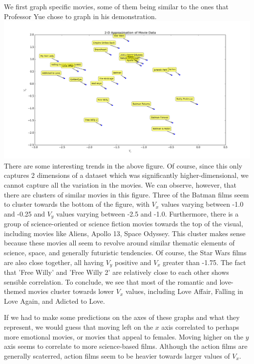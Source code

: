 \documentclass{article}
\begin{document}
We first graph specific movies, some of them being similar to the ones
that Professor Yue chose to graph in his demonstration.\\
\includegraphics[width=1\textwidth]{final_graph_1}
There are some interesting trends in the above figure. Of course, since
this only captures 2 dimensions of a dataset which was significantly
higher-dimensional, we cannot capture all the variation in the movies.
We can observe, however, that there are clusters of similar movies
in this figure. Three of the Batman films seem to cluster towards the bottom
of the figure, with $V_{x}$ values varying between -1.0 and -0.25 and
$V_y$ values varying between -2.5 and -1.0. Furthermore, there is a group
of science-oriented or science fiction movies towards the top of the visual,
including movies like Aliens, Apollo 13, Space Odyssey. This cluster makes
sense because these movies all seem to revolve around similar thematic elements
of science, space, and generally futuristic tendencies. Of course, the Star Wars
films are also close together, all having $V_{y}$ positive and $V_x$ greater than
-1.75. The fact that 'Free Willy' and 'Free Willy 2' are relatively close
to each other shows sensible correlation. To conclude, we see that most of
the romantic and love-themed movies cluster towards lower $V_x$ values,
including Love Affair, Falling in Love Again, and Adicted to Love.

If we had to make some predictions on the axes of these graphs and what they
represent, we would guess that moving left on the $x$ axis correlated
to perhaps more emotional movies, or movies that appeal to females. Moving
higher on the $y$ axis seems to correlate to more science-based films. Although
the action films are generally scaterred, action films seem to be heavier
towards larger values of $V_x$.\\
\end{document}
